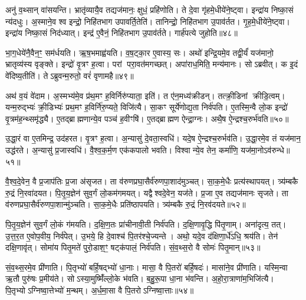 अनु॑ व॒थ्सान् वा॑सयन्ति।
भ्रातृ॑व्यायै॒व तद्यज॑मानः॒ क्षुधं॒ प्रहि॑णोति।
ते दे॒वा गृ॑हमे॒धीये॑ने॒ष्ट्वा।
इन्द्रा॑य निष्का॒सं न्य॑दधुः।
अ॒स्माने॒व श्व इन्द्रो॒ निहि॑तभाग उपावर्ति॒तेति॑।
तानिन्द्रो॒ निहि॑तभाग उ॒पाव॑र्तत।
गृ॒ह॒मे॒धीये॑ने॒ष्ट्वा।
इन्द्रा॑य निष्का॒सं निद॑ध्यात्।
इन्द्र॑ ए॒वैनं॒ निहि॑तभाग उ॒पाव॑र्तते।
गार्\mbox{}ह॑पत्ये जुहोति॥४८॥

भा॒ग॒धेये॑नै॒वैन॒ꣳ॒ सम॑र्धयति।
ऋ॒ष॒भमाह्व॑यति।
व॒ष॒ट्का॒र ए॒वास्य॒ सः।
अथो॑ इन्द्रि॒यमे॒व तद्वी॒र्यं॑ यज॑मानो॒ भ्रातृव्य॑स्य वृङ्क्ते।
इन्द्रो॑ वृ॒त्रꣳ ह॒त्वा।
परां परा॒वत॑मगच्छत्।
अपा॑राध॒मिति॒ मन्य॑मानः।
सोऽब्रवीत्।
क इ॒दं वे॑दिष्य॒तीति॑।
तेऽब्रुवन्म॒रुतो॒ वरं॑ वृणामहै॥४९॥

अथ॑ व॒यं वे॑दाम।
अ॒स्मभ्य॑मे॒व प्र॑थ॒मꣳ ह॒विर्निरु॑प्याता॒ इति॑।
त ए॑न॒मध्य॑क्रीडन्।
तत्क्री॒डिनां क्रीडि॒त्वम्।
यन्म॒रुद्भ्यः॑ क्री॒डिभ्यः॑ प्रथ॒मꣳ ह॒विर्नि॑रु॒प्यते॒ विजि॑त्यै।
सा॒कꣳ सूर्ये॑णोद्य॒ता निर्व॑पति।
ए॒तस्मि॒न्वै लो॒क इन्द्रो॑ वृ॒त्रम॑ह॒न्थ्समृ॑द्ध्यै।
ए॒तद्ब्राह्मणान्ये॒व पञ्च॑ ह॒वीꣳषि॑।
ए॒तद्ब्राह्मण ऐन्द्रा॒ग्नः।
अथै॒ष ऐ॒न्द्रश्च॒रुर्भ॑वति॥५०॥

उ॒द्धा॒रं वा ए॒तमिन्द्र॒ उद॑हरत।
वृ॒त्रꣳ ह॒त्वा।
अ॒न्यासु॑ दे॒वता॒स्वधि॑।
यदे॒ष ऐ॒न्द्रश्च॒रुर्भव॑ति।
उ॒द्धा॒रमे॒व तं यज॑मान॒ उद्ध॑रते।
अ॒न्यासु॑ प्र॒जास्वधि॑।
वै॒श्व॒क॒र्म॒ण एक॑कपालो भवति।
विश्वान्ये॒व तेन॒ कर्मा॑णि॒ यज॑मा॒नो\-ऽव॑रुन्धे॥५१॥\anuvakamend[ऋ॒द्ध्य॒ते॒\-ऽभ्य॑ञ्जते जुहोति वृणामहै भवत्य॒ष्टौ च॑]

वै॒श्व॒दे॒वेन॒ वै प्र॒जाप॑तिः प्र॒जा अ॑सृजत।
ता व॑रुण\-प्रघा॒सैर्व॑रुण\-पा॒शाद॑मुञ्चत्।
सा॒क॒मे॒धैः प्रत्य॑स्थापयत्।
त्र्य॑म्बकै रु॒द्रं नि॒रवा॑दयत।
पि॒तृ॒य॒ज्ञेन॑ सुव॒र्गं लो॒कम॑गमयत्।
यद्वैश्वदे॒वेन॒ यज॑ते।
प्र॒जा ए॒व तद्यज॑मानः सृजते।
ता व॑रुणप्रघा॒सैर्व॑रुणपा॒शान्मु॑ञ्चति।
सा॒क॒मे॒धैः प्रति॑ष्ठापयति।
त्र्य॑म्बकै रु॒द्रं नि॒रव॑दयते॥५२॥

पि॒तृ॒य॒ज्ञेन॑ सुव॒र्गं लो॒कं ग॑मयति।
द॒क्षि॒ण॒तः प्रा॑चीनावी॒ती निर्व॑पति।
द॒क्षि॒णावृ॒द्धि पि॑तृ॒णाम्।
अना॑दृत्य॒ तत्।
उ॒त्त॒र॒त ए॒वोप॒वीय॒ निर्व॑पेत्।
उ॒भये॒ हि दे॒वाश्च॑ पि॒तर॑श्चे॒ज्यन्ते।
अथो॒ यदे॒व द॑क्षिणा॒र्धे॑ऽधि॒ श्रय॑ति।
तेन॑ दक्षि॒णावृ॑त्।
सोमा॑य पितृ॒मते॑ पुरो॒डाश॒ꣳ॒ षट्क॑पालं॒ निर्व॑पति।
सं॒व॒थ्स॒रो वै सोमः॑ पितृ॒मान्॥५३॥

सं॒व॒थ्स॒रमे॒व प्री॑णाति।
पि॒तृभ्यो॑ बर्\mbox{}हि॒षद्भ्यो॑ धा॒नाः।
मासा॒ वै पि॒तरो॑ बर्\mbox{}हि॒षदः॑।
मासा॑ने॒व प्री॑णाति।
यस्मि॒न्वा ऋ॒तौ पुरु॑षः प्र॒मीय॑ते।
सोऽस्या॒मुष्मिँ॑ल्लो॒के भ॑वति।
ब॒हु॒रू॒पा धा॒ना भ॑वन्ति।
अ॒हो॒रा॒त्राणा॑म॒भिजि॑त्यै।
पि॒तृभ्यो\-ऽग्निष्वा॒त्तेभ्यो॑ म॒न्थम्।
अ॒र्ध॒मा॒सा वै पि॒तरो\-ऽग्निष्वा॒त्ताः॥५४॥

